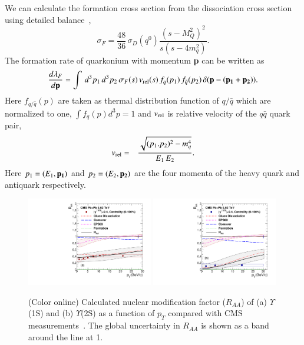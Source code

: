 {  We can calculate the formation cross section from the dissociation cross section using detailed balance~\cite{Thews:2000rj,Thews:2005vj},
  \begin{equation}
    \sigma_{F} = \frac{48}{36}\,\sigma_{D}(q^0)\frac{(s-M_{Q}^2)^{2}}{s(s-4m_q^{2})}.
  \end{equation}
  The formation rate of quarkonium with momentum {\bf p} can be written as
  \begin{equation}
    \frac{d\lambda_{F}}{d{\rm\bf p}} = \int \,d^{3}p_1 \,d^{3}p_2 \,\sigma_{F}(s)\, v_{\rm rel}(s)\,f_{q}(p_1)\, f_{\bar{q}} (p_2)\,\delta({\rm\bf p}-( {\rm\bf p_1} + {\rm\bf p_2} )).
  \end{equation}
  Here $f_{q/\bar{q}}(p)$ are taken as thermal distribution function of  $q/\bar{q}$ which are 
  normalized to one, $\int f_{q}(p) d^{3}p  = 1 $ and $v_{\rm rel}$ is relative velocity of the
  $q\bar{q}$ quark pair,
  \begin{eqnarray}
    v_{\rm rel} &=& {\sqrt{(p_{1}.p_{2})^{2} - m_q^{4} } \over E_{1} \, E_{2}}. %
  \end{eqnarray}
  Here $p_1 = (E_1,{\bf p_{1}})$ and $p_{2} = (E_{2},{\bf p_{2}})$ are the four momenta of the heavy quark and 
  antiquark respectively.


  

\begin{figure}
\includegraphics[width=0.49\textwidth]{Figures/Quarkonia_502TeV/Fig7a_Y1S_CMS_RAAPt_Shade.pdf}
\includegraphics[width=0.49\textwidth]{Figures/Quarkonia_502TeV/Fig7b_Y2S_CMS_RAAPt_Shade.pdf}
\caption{(Color online) Calculated nuclear modification factor ($R_{AA}$) of (a) $\Upsilon$(1S) and 
  (b) $\Upsilon$(2S) as a function of $p_{T}$ 
  compared with CMS measurements~\cite{Sirunyan:2018nsz}.
The global uncertainty in $R_{AA}$ is shown as a band around the line at 1.
}
\label{fig:UpsilonRaaPtCMS}
\end{figure}



}
